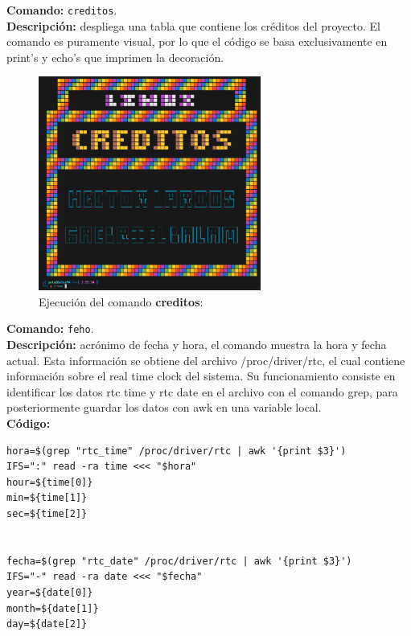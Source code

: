 \documentclass[titlepage]{article}
\begin{document}
\noindent
\textbf{Comando:} \verb|creditos|. \\
\textbf{Descripción:} despliega una tabla que contiene los créditos del proyecto. El comando es puramente visual, por lo que el código se basa exclusivamente en print's y echo's que imprimen la decoración.

\begin{figure}[H]
    \centering
    \includegraphics[width=0.65\textwidth]{creditos.png}
    \caption{Ejecución del comando \textbf{creditos}:}
    \label{fig:ejemplo}
\end{figure}

\newpage
\noindent
\textbf{Comando:} \verb|feho|. \\
\textbf{Descripción:} acrónimo de fecha y hora, el comando muestra la hora y fecha actual. Esta información se obtiene del archivo /proc/driver/rtc, el cual contiene información sobre el real time clock del sistema. Su funcionamiento consiste en identificar los datos rtc time y rtc date en el archivo con el comando grep, para posteriormente guardar los datos con awk en una variable local.\\

\noindent
\textbf{Código:}
\begin{lstlisting}
hora=$(grep "rtc_time" /proc/driver/rtc | awk '{print $3}')
IFS=":" read -ra time <<< "$hora"
hour=${time[0]}
min=${time[1]}
sec=${time[2]}


fecha=$(grep "rtc_date" /proc/driver/rtc | awk '{print $3}')
IFS="-" read -ra date <<< "$fecha"
year=${date[0]}
month=${date[1]}
day=${date[2]}
\end{lstlisting}
\end{document}
